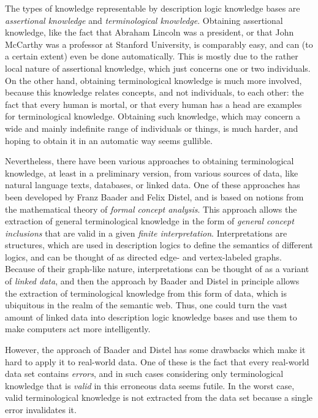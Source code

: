 The types of knowledge representable by description logic knowledge bases are
\emph{assertional knowledge} and \emph{terminological knowledge}.  Obtaining assertional
knowledge, like the fact that Abraham Lincoln was a president, or that John McCarthy was a
professor at Stanford University, is comparably easy, and can (to a certain extent) even
be done automatically.  This is mostly due to the rather local nature of assertional
knowledge, which just concerns one or two individuals.  On the other hand, obtaining
terminological knowledge is much more involved, because this knowledge relates concepts,
and not individuals, to each other: the fact that every human is mortal, or that every
human has a head are examples for terminological knowledge.  Obtaining such knowledge,
which may concern a wide and mainly indefinite range of individuals or things, is much
harder, and hoping to obtain it in an automatic way seems gullible.

Nevertheless, there have been various approaches to obtaining terminological knowledge, at
least in a preliminary version, from various sources of data, like natural language texts,
databases, or linked data.  One of these approaches has been developed by Franz Baader and
Felix Distel, and is based on notions from the mathematical theory of \emph{formal concept
  analysis}.  This approach allows the extraction of general terminological knowledge in
the form of \emph{general concept inclusions} that are valid in a given \emph{finite
  interpretation}.  Interpretations are structures, which are used in description logics
to define the semantics of different logics, and can be thought of as directed edge- and
vertex-labeled graphs.  Because of their graph-like nature, interpretations can be thought
of as a variant of \emph{linked data}, and then the approach by Baader and Distel in
principle allows the extraction of terminological knowledge from this form of data, which
is ubiquitous in the realm of the semantic web.  Thus, one could turn the vast amount of
linked data into description logic knowledge bases and use them to make computers act more
intelligently.

However, the approach of Baader and Distel has some drawbacks which make it hard to apply
it to real-world data.  One of these is the fact that every real-world data set contains
\emph{errors}, and in such cases considering only terminological knowledge that is
\emph{valid} in this erroneous data seems futile.  In the worst case, valid terminological
knowledge is not extracted from the data set because a single error invalidates it.

